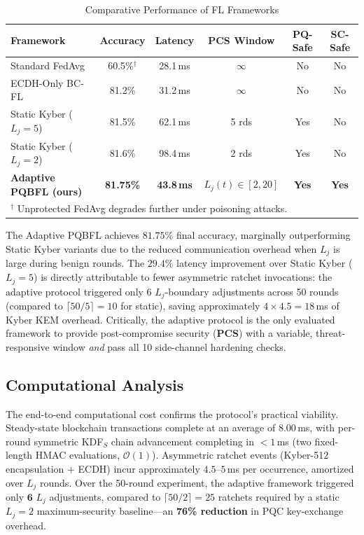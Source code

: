 \documentclass[journal, 10pt, twocolumn]{IEEEtran}
\begin{document}
\begin{table}
\centering
\caption{Comparative Performance of FL Frameworks}
\label{tab:comparison_table}
\begin{tabular}{l c c c c c}
\toprule
\textbf{Framework} & \textbf{Accuracy} & \textbf{Latency} & \textbf{PCS Window} & \textbf{PQ-Safe} & \textbf{SC-Safe} \\
\midrule
Standard FedAvg        & 60.5\%$^\dagger$ & 28.1\,ms & $\infty$ & No  & No  \\
ECDH-Only BC-FL        & 81.2\%           & 31.2\,ms & $\infty$ & No  & No  \\
Static Kyber ($L_j=5$) & 81.5\%           & 62.1\,ms & 5 rds    & Yes & No  \\
Static Kyber ($L_j=2$) & 81.6\%           & 98.4\,ms & 2 rds    & Yes & No  \\
\textbf{Adaptive PQBFL (ours)} & \textbf{81.75\%} & \textbf{43.8\,ms} & \textbf{$L_j(t)\in[2,20]$} & \textbf{Yes} & \textbf{Yes} \\
\bottomrule
\multicolumn{6}{l}{$^\dagger$ Unprotected FedAvg degrades further under poisoning attacks.}
\end{tabular}
\end{table}

The Adaptive PQBFL achieves $81.75\%$ final accuracy, marginally outperforming Static Kyber variants due to the reduced communication overhead when $L_j$ is large during benign rounds. The $29.4\%$ latency improvement over Static Kyber ($L_j=5$) is directly attributable to fewer asymmetric ratchet invocations: the adaptive protocol triggered only 6 $L_j$-boundary adjustments across 50 rounds (compared to $\lceil 50/5 \rceil = 10$ for static), saving approximately $4 \times 4.5 = 18$\,ms of Kyber KEM overhead. Critically, the adaptive protocol is the only evaluated framework to provide post-compromise security (\textbf{PCS}) with a variable, threat-responsive window \emph{and} pass all 10 side-channel hardening checks.

\subsection{Computational Analysis}
The end-to-end computational cost confirms the protocol's practical viability. Steady-state blockchain transactions complete at an average of $8.00$\,ms, with per-round symmetric KDF$_S$ chain advancement completing in $<1$\,ms (two fixed-length HMAC evaluations, $\mathcal{O}(1)$). Asymmetric ratchet events (Kyber-512 encapsulation + ECDH) incur approximately $4.5$--$5$\,ms per occurrence, amortized over $L_j$ rounds. Over the 50-round experiment, the adaptive framework triggered only $\mathbf{6}$ $L_j$ adjustments, compared to $\lceil50/2\rceil=25$ ratchets required by a static $L_j=2$ maximum-security baseline---an \textbf{76\% reduction} in PQC key-exchange overhead.
\end{document}
